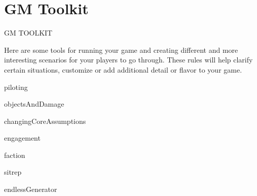 \part{GM Toolkit}
                                     GM TOOLKIT

Here are some tools for running your game and creating different and more interesting scenarios
for your players to go through. These rules will help clarify certain situations, customize or add
additional detail or flavor to your game.

{piloting}

{objectsAndDamage}

{changingCoreAssumptions}

{engagement}

{faction}

{sitrep}

{endlessGenerator}